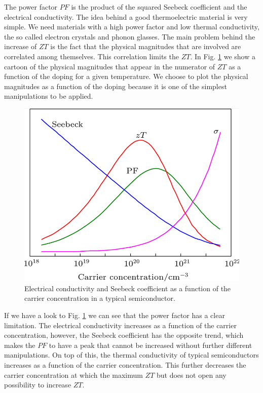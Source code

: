 The power factor $PF$ is the product of the squared Seebeck coefficient and the electrical conductivity. The idea
behind a good thermoelectric material is very simple. We need materials with a high power factor and low thermal
conductivity, the so called electron crystals and phonon glasses. The main problem behind the increase of $ZT$ 
is the fact that the physical magnitudes that are involved are correlated among themselves. This correlation limits 
the $ZT$. In Fig. \ref{decouple} we show a cartoon of the physical magnitudes that appear in the numerator of $ZT$ 
as a function of the doping for a given temperature. We choose to plot the physical magnitudes as a function of the
doping because it is one of the simplest manipulations to be applied. 
\begin{figure}[h]
\begin{center}
\includegraphics[width=0.8\linewidth]{Figures/decoupling.png}
\caption[Thermoelectric physical magnitudes]{Electrical conductivity and  Seebeck coefficient as a function of the 
carrier concentration in a typical semiconductor.}
\label{decouple}
\end{center}
\end{figure}
If we have a look to Fig. \ref{decouple} we can see that the power factor has a clear limitation. The electrical 
conductivity increases as a function of the carrier concentration, however, the Seebeck coefficient has the opposite 
trend, which makes the $PF$ to have a peak that cannot be increased without further different manipulations. On top 
of this, the thermal conductivity of typical semiconductors increases as a function of the carrier concentration. 
This further decreases the carrier concentration at which the maximum $ZT$ but does not open any possibility to 
increase $ZT$. \\


